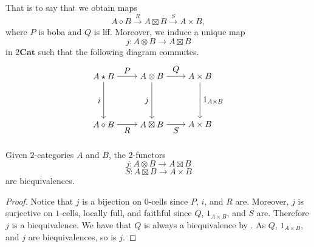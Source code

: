 \documentclass{tac}
\begin{document}
That is to say that we obtain maps
\[
A\diamond B\xrightarrow{R}A\boxtimes B\xrightarrow{S}A\times B,
\]
where $P$ is boba and $Q$ is lff. Moreover, we induce a unique map 
\[
j:A\otimes B\to A\boxtimes B
\]
in $2\mathbf{Cat}$ such that the following diagram commutes.
\[
\begin{tikzpicture}[node distance=2cm]
\node (A) {$A\star B$};
\node (B) [below of=A] {$A\diamond B$};
\node (C) [right of=A] {$A\otimes B$};
\node (D) [below of=C] {$A\boxtimes B$};
\node (E) [right of=C] {$A\times B$};
\node (F) [below of=E] {$A\times B$};

\draw[->] (A) -- node[left] {$i$} (B);
\draw[->] (A) -- node[above] {$P$} (C);
\draw[->] (B) -- node[below] {$R$} (D);
\draw[->] (C) -- node[left] {$j$} (D);
\draw[->] (C) -- node[above] {$Q$} (E);
\draw[->] (D) -- node[below] {$S$} (F);
\draw[->] (E) -- node[right] {$1_{A\times B}$} (F);
\end{tikzpicture}
\]

\begin{lemma}\label{biequival_between_products}
Given $2$-categories $A$ and $B$, the $2$-functors 
\[
j:A\otimes B\to A\boxtimes B
\]
\[
S:A\boxtimes B\to A\times B
\]
are biequivalences.
\end{lemma}

\begin{proof}
   Notice that $j$ is a bijection on $0$-cells since $P$, $i$, and $R$ are. Moreover, $j$ is surjective on $1$-cells, locally full, and faithful since $Q$, $1_{A\times B}$, and $S$ are. Therefore $j$ is a biequivalence. We have that $Q$ is always a biequivalence by \cite{Lack2002}. As $Q$, $1_{A\times B}$, and $j$ are biequivalences, so is $j$.
\end{proof}
\end{document}
